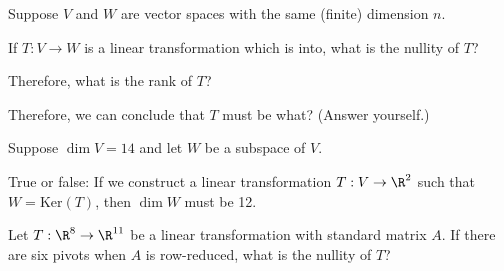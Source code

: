 
Suppose $V$ and $W$ are vector spaces with the same (finite) dimension $n$.  

If $T: V\rightarrow W$ is a linear transformation which is into, what is the nullity of $T$?  



Therefore, what is the rank of $T$?  


Therefore, we can conclude that $T$ must be what?  (Answer yourself.)  

\edXsolution{
}

\endedxproblem



\endedxvertical






Suppose $\dim V = 14$ and let $W$ be a subspace of $V$. 

True or false: If we construct a linear transformation $T: V \rightarrow \R^2$ such that $W = \mathrm{Ker}(T)$,
then $\dim W$ must be 12.  




\edXsolution{
}

\endedxproblem


\endedxvertical









Let $T: \R^{8}\rightarrow \R^{11}$ be a linear transformation with standard matrix $A$.  If 
there are six pivots when $A$ is row-reduced, what is the nullity of $T$?  



